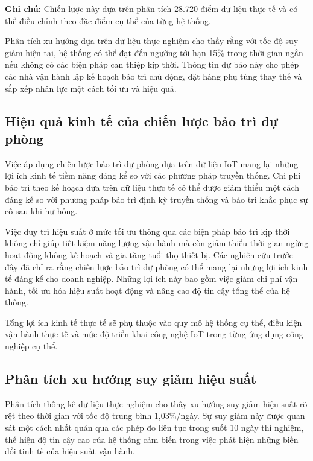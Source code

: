 \documentclass[../main.tex]{subfiles}
\begin{document}
\textbf{Ghi chú:} Chiến lược này dựa trên phân tích 28.720 điểm dữ liệu thực tế và có thể điều chỉnh theo đặc điểm cụ thể của từng hệ thống.

Phân tích xu hướng dựa trên dữ liệu thực nghiệm cho thấy rằng với tốc độ suy giảm hiện tại, hệ thống có thể đạt đến ngưỡng tới hạn 15\% trong thời gian ngắn nếu không có các biện pháp can thiệp kịp thời. Thông tin dự báo này cho phép các nhà vận hành lập kế hoạch bảo trì chủ động, đặt hàng phụ tùng thay thế và sắp xếp nhân lực một cách tối ưu và hiệu quả.

\subsection{Hiệu quả kinh tế của chiến lược bảo trì dự phòng}
\label{sec:predictive_maintenance_economics}

Việc áp dụng chiến lược bảo trì dự phòng dựa trên dữ liệu IoT mang lại những lợi ích kinh tế tiềm năng đáng kể so với các phương pháp truyền thống. Chi phí bảo trì theo kế hoạch dựa trên dữ liệu thực tế có thể được giảm thiểu một cách đáng kể so với phương pháp bảo trì định kỳ truyền thống và bảo trì khắc phục sự cố sau khi hư hỏng.

Việc duy trì hiệu suất ở mức tối ưu thông qua các biện pháp bảo trì kịp thời không chỉ giúp tiết kiệm năng lượng vận hành mà còn giảm thiểu thời gian ngừng hoạt động không kế hoạch và gia tăng tuổi thọ thiết bị. Các nghiên cứu trước đây đã chỉ ra rằng chiến lược bảo trì dự phòng có thể mang lại những lợi ích kinh tế đáng kể cho doanh nghiệp. Những lợi ích này bao gồm việc giảm chi phí vận hành, tối ưu hóa hiệu suất hoạt động và nâng cao độ tin cậy tổng thể của hệ thống.

Tổng lợi ích kinh tế thực tế sẽ phụ thuộc vào quy mô hệ thống cụ thể, điều kiện vận hành thực tế và mức độ triển khai công nghệ IoT trong từng ứng dụng công nghiệp cụ thể.

\subsection{Phân tích xu hướng suy giảm hiệu suất}
\label{sec:performance_trend_analysis}

Phân tích thống kê dữ liệu thực nghiệm cho thấy xu hướng suy giảm hiệu suất rõ rệt theo thời gian với tốc độ trung bình 1,03\%/ngày. Sự suy giảm này được quan sát một cách nhất quán qua các phép đo liên tục trong suốt 10 ngày thí nghiệm, thể hiện độ tin cậy cao của hệ thống cảm biến trong việc phát hiện những biến đổi tinh tế của hiệu suất vận hành.
\end{document}

